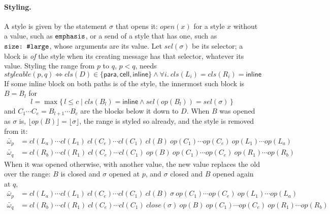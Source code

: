 \documentclass[11pt]{article}
\numberwithin{equation}{section}
\newcommand{\kw}[1]{\ensuremath{\mathsf{#1}}}
\newcommand{\str}[1]{\ensuremath{\text{\texttt{#1}}}}
\begin{document}
\paragraph{Styling.}
A style is given by the statement $\sigma$ that opens it: $\mathit{open}(x)$
for a style $x$ without a value, such as $\str{emphasis}$, or a send of a
style that has one, such as $\str{size:\ \#large}$, whose arguments are its
value.  Let $\mathit{sel}(\sigma)$ be its selector; a block is \emph{of} the
style when its creating message has that selector, whatever its value.
Styling the range from $p$ to $q$, $p < q$, needs
\begin{equation}\label{eq:style-ok}
\mathit{styleable}(p, q) \iff \mathit{cls}(D) \in \{\kw{para}, \kw{cell},
  \kw{inline}\} \wedge \forall i.\ \mathit{cls}(L_i) = \mathit{cls}(R_i) =
  \kw{inline}
\end{equation}
If some inline block on both paths is of the style, the innermost such block
is $B = B_l$ for
\[
l = \max\{\, l \le c \mid \mathit{cls}(B_l) = \kw{inline} \wedge
  \mathit{sel}(\mathit{op}(B_l)) = \mathit{sel}(\sigma) \,\}
\]
and $C_1 \cdots C_e = B_{l+1} \cdots B_c$ are the blocks below it down to
$D$.  When $B$ was opened as $\sigma$ is, $\lfloor \mathit{op}(B) \rfloor =
\lfloor \sigma \rfloor$, the range is styled so already, and the style is
removed from it:
\begin{equation}\label{eq:edit-unstyle}
\begin{aligned}
\bar\omega_p &= \mathit{cl}(L_a) \cdots \mathit{cl}(L_1)\
  \mathit{cl}(C_e) \cdots \mathit{cl}(C_1)\ \mathit{cl}(B)\
  \mathit{op}(C_1) \cdots \mathit{op}(C_e)\
  \mathit{op}(L_1) \cdots \mathit{op}(L_a) \\
\bar\omega_q &= \mathit{cl}(R_b) \cdots \mathit{cl}(R_1)\
  \mathit{cl}(C_e) \cdots \mathit{cl}(C_1)\ \mathit{op}(B)\
  \mathit{op}(C_1) \cdots \mathit{op}(C_e)\
  \mathit{op}(R_1) \cdots \mathit{op}(R_b)
\end{aligned}
\end{equation}
When it was opened otherwise, with another value, the new value replaces
the old over the range: $B$ is closed and $\sigma$ opened at $p$, and
$\sigma$ closed and $B$ opened again at $q$,
\begin{equation}\label{eq:edit-replace-style}
\begin{aligned}
\bar\omega_p &= \mathit{cl}(L_a) \cdots \mathit{cl}(L_1)\
  \mathit{cl}(C_e) \cdots \mathit{cl}(C_1)\ \mathit{cl}(B)\ \sigma\
  \mathit{op}(C_1) \cdots \mathit{op}(C_e)\
  \mathit{op}(L_1) \cdots \mathit{op}(L_a) \\
\bar\omega_q &= \mathit{cl}(R_b) \cdots \mathit{cl}(R_1)\
  \mathit{cl}(C_e) \cdots \mathit{cl}(C_1)\ \mathit{close}(\sigma)\
  \mathit{op}(B)\ \mathit{op}(C_1) \cdots \mathit{op}(C_e)\
  \mathit{op}(R_1) \cdots \mathit{op}(R_b)
\end{aligned}
\end{equation}
\end{document}
